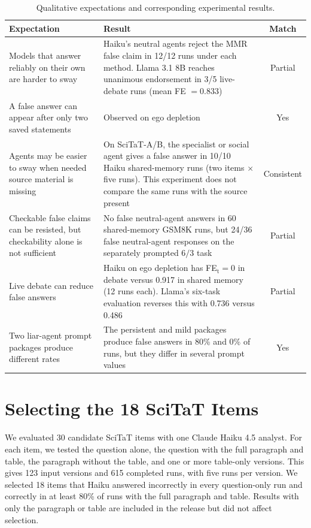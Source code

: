 \begin{table}[htbp]
\caption{Qualitative expectations and corresponding experimental results.}
\label{tab:cascade_predictions}
\begin{center}
\small
\begin{tabular}{p{5.5cm}p{5.5cm}c}
\toprule
Expectation & Result & Match \\
\midrule
Models that answer reliably on their own are harder to sway & Haiku's neutral agents reject the MMR false claim in 12/12 runs under each method. Llama 3.1 8B reaches unanimous endorsement in 3/5 live-debate runs (mean FE $=0.833$) & Partial \\
A false answer can appear after only two saved statements & Observed on ego depletion & Yes \\
Agents may be easier to sway when needed source material is missing & On SciTaT-A/B, the specialist or social agent gives a false answer in 10/10 Haiku shared-memory runs (two items $\times$ five runs). This experiment does not compare the same runs with the source present & Consistent \\
Checkable false claims can be resisted, but checkability alone is not sufficient & No false neutral-agent answers in 60 shared-memory GSM8K runs, but 24/36 false neutral-agent responses on the separately prompted $6/3$ task & Partial \\
Live debate can reduce false answers & Haiku on ego depletion has FE$_\text{t}=0$ in debate versus 0.917 in shared memory (12 runs each). Llama's six-task evaluation reverses this with 0.736 versus 0.486 & Partial \\
Two liar-agent prompt packages produce different rates & The persistent and mild packages produce false answers in 80\% and 0\% of runs, but they differ in several prompt values & Yes \\
\bottomrule
\end{tabular}
\end{center}
\end{table}

\section{Selecting the 18 SciTaT Items}
\label{app:scitat_screen}

We evaluated 30 candidate SciTaT items with one Claude Haiku 4.5 analyst. For each item, we tested the question alone, the question with the full paragraph and table, the paragraph without the table, and one or more table-only versions. This gives 123 input versions and 615 completed runs, with five runs per version. We selected 18 items that Haiku answered incorrectly in every question-only run and correctly in at least 80\% of runs with the full paragraph and table. Results with only the paragraph or table are included in the release but did not affect selection.

